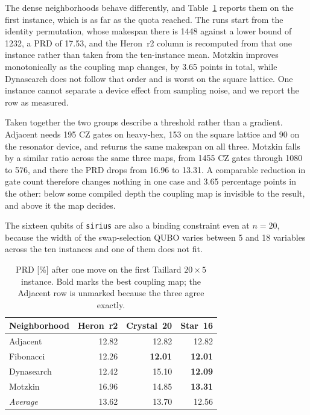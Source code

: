 \documentclass{svproc}
\begin{document}
The dense neighborhoods behave differently, and Table~\ref{tab:arch} reports
them on the first instance, which is as far as the quota reached. The runs
start from the identity permutation, whose makespan there is 1448 against a
lower bound of 1232, a PRD of 17.53, and the Heron~r2 column is recomputed
from that one instance rather than taken from the ten-instance mean. Motzkin
improves monotonically as the coupling map changes, by 3.65 points in total,
while Dynasearch does not follow that order and is worst on the square
lattice. One instance cannot separate a device effect from sampling noise, and
we report the row as measured.

Taken together the two groups describe a threshold rather than a gradient.
Adjacent needs 195 CZ gates on heavy-hex, 153 on the square lattice and 90 on
the resonator device, and returns the same makespan on all three. Motzkin
falls by a similar ratio across the same three maps, from 1455 CZ gates
through 1080 to 576, and there the PRD drops from 16.96 to 13.31. A comparable
reduction in gate count therefore changes nothing in one case and 3.65
percentage points in the other: below some compiled depth the coupling map is
invisible to the result, and above it the map decides.

The sixteen qubits of \texttt{sirius} are also a binding constraint even at
$n=20$, because the width of the swap-selection QUBO varies between 5 and 18
variables across the ten instances and one of them does not fit.

\begin{table}[t]
\centering
\caption{PRD [\%] after one move on the first Taillard $20\times5$ instance.
  Bold marks the best coupling map; the Adjacent row is unmarked because the
  three agree exactly.}
\label{tab:arch}
\footnotesize
\begin{tabular*}{\textwidth}{@{\extracolsep{\fill}}lrrr@{}}
\toprule
Neighborhood & Heron~r2 & Crystal~20 & Star~16 \\
\midrule
Adjacent    & 12.82 & 12.82 & 12.82 \\
Fibonacci   & 12.26 & \textbf{12.01} & \textbf{12.01} \\
Dynasearch  & 12.42 & 15.10 & \textbf{12.09} \\
Motzkin     & 16.96 & 14.85 & \textbf{13.31} \\
\midrule
\emph{Average} & 13.62 & 13.70 & 12.56 \\
\bottomrule
\end{tabular*}
\end{table}
\end{document}
